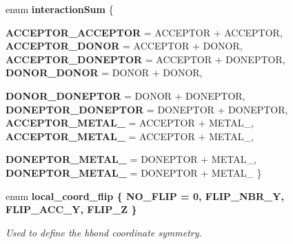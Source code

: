 \begin{CompactItemize}
\item 
enum \textbf{interaction\-Sum} \{ \par
\textbf{ACCEPTOR\_\-ACCEPTOR} =  ACCEPTOR + ACCEPTOR, 
\textbf{ACCEPTOR\_\-DONOR} =  ACCEPTOR + DONOR, 
\textbf{ACCEPTOR\_\-DONEPTOR} =  ACCEPTOR + DONEPTOR, 
\textbf{DONOR\_\-DONOR} =  DONOR + DONOR, 
\par
\textbf{DONOR\_\-DONEPTOR} =  DONOR + DONEPTOR, 
\textbf{DONEPTOR\_\-DONEPTOR} =  DONEPTOR + DONEPTOR, 
\textbf{ACCEPTOR\_\-METAL\_} =  ACCEPTOR + METAL\_, 
\textbf{ACCEPTOR\_\-METAL\_} =  ACCEPTOR + METAL\_, 
\par
\textbf{DONEPTOR\_\-METAL\_} =  DONEPTOR + METAL\_, 
\textbf{DONEPTOR\_\-METAL\_} =  DONEPTOR + METAL\_
 \}
\item 
enum \bf{local\_\-coord\_\-flip} \{ \textbf{NO\_\-FLIP} =  0, 
\textbf{FLIP\_\-NBR\_\-Y}, 
\textbf{FLIP\_\-ACC\_\-Y}, 
\textbf{FLIP\_\-Z}
 \}
\begin{CompactList}\small\item\em Used to define the hbond coordinate symmetry. \item\end{CompactList}\end{CompactItemize}
